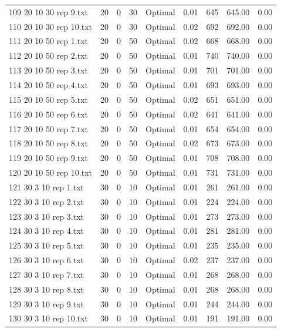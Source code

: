 \begin{longtable}{lrrllrrrr}
109 20 10 30 rep 9.txt & 20 & 0 & 30 & Optimal &  0.01 & 645 & 645.00 &  0.00\\
110 20 10 30 rep 10.txt & 20 & 0 & 30 & Optimal &  0.02 & 692 & 692.00 &  0.00\\
111 20 10 50 rep 1.txt & 20 & 0 & 50 & Optimal &  0.02 & 668 & 668.00 &  0.00\\
112 20 10 50 rep 2.txt & 20 & 0 & 50 & Optimal &  0.01 & 740 & 740.00 &  0.00\\
113 20 10 50 rep 3.txt & 20 & 0 & 50 & Optimal &  0.01 & 701 & 701.00 &  0.00\\
114 20 10 50 rep 4.txt & 20 & 0 & 50 & Optimal &  0.01 & 693 & 693.00 &  0.00\\
115 20 10 50 rep 5.txt & 20 & 0 & 50 & Optimal &  0.02 & 651 & 651.00 &  0.00\\
116 20 10 50 rep 6.txt & 20 & 0 & 50 & Optimal &  0.02 & 641 & 641.00 &  0.00\\
117 20 10 50 rep 7.txt & 20 & 0 & 50 & Optimal &  0.01 & 654 & 654.00 &  0.00\\
118 20 10 50 rep 8.txt & 20 & 0 & 50 & Optimal &  0.02 & 673 & 673.00 &  0.00\\
119 20 10 50 rep 9.txt & 20 & 0 & 50 & Optimal &  0.01 & 708 & 708.00 &  0.00\\
120 20 10 50 rep 10.txt & 20 & 0 & 50 & Optimal &  0.01 & 731 & 731.00 &  0.00\\
121 30 3 10 rep 1.txt & 30 & 0 & 10 & Optimal &  0.01 & 261 & 261.00 &  0.00\\
122 30 3 10 rep 2.txt & 30 & 0 & 10 & Optimal &  0.01 & 224 & 224.00 &  0.00\\
123 30 3 10 rep 3.txt & 30 & 0 & 10 & Optimal &  0.01 & 273 & 273.00 &  0.00\\
124 30 3 10 rep 4.txt & 30 & 0 & 10 & Optimal &  0.01 & 281 & 281.00 &  0.00\\
125 30 3 10 rep 5.txt & 30 & 0 & 10 & Optimal &  0.01 & 235 & 235.00 &  0.00\\
126 30 3 10 rep 6.txt & 30 & 0 & 10 & Optimal &  0.02 & 237 & 237.00 &  0.00\\
127 30 3 10 rep 7.txt & 30 & 0 & 10 & Optimal &  0.01 & 268 & 268.00 &  0.00\\
128 30 3 10 rep 8.txt & 30 & 0 & 10 & Optimal &  0.01 & 268 & 268.00 &  0.00\\
129 30 3 10 rep 9.txt & 30 & 0 & 10 & Optimal &  0.01 & 244 & 244.00 &  0.00\\
130 30 3 10 rep 10.txt & 30 & 0 & 10 & Optimal &  0.01 & 191 & 191.00 &  0.00\\

\end{longtable}
